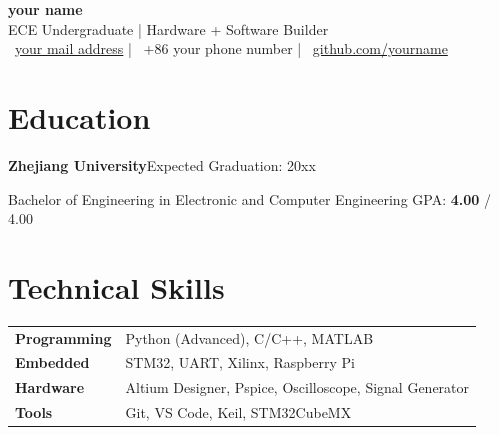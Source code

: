 \documentclass[10pt,a4paper]{article}
\newcommand{\entry}[2]{%
  \noindent\textbf{#1}\hfill{#2}\par
}
\begin{document}
\begin{center}
  {\headingfont\Huge\bfseries your name}\\[4pt]
  {\normalsize ECE Undergraduate | Hardware + Software Builder}\\[6pt]
  {\small
    \faEnvelope\ \href{mailto:your mail address}{your mail address}
    \quad|\quad
    \faPhone\ +86 your phone number
    \quad|\quad
    \faGithub\ \href{https://github.com/yourname}{github.com/yourname}
  }
\end{center}

\section{Education}

\entry{Zhejiang University}{Expected Graduation: 20xx}
Bachelor of Engineering in Electronic and Computer Engineering \hfill GPA: \textbf{4.00} / 4.00\par %
\vspace{2pt}

\section{Technical Skills}


\begin{tabular}{@{}p{3.2cm}@{}p{14cm}@{}}
  \textbf{Programming}      & Python (Advanced), C/C++, MATLAB \\[3pt]
  \textbf{Embedded}         & STM32, UART, Xilinx, Raspberry Pi \\[3pt]
  \textbf{Hardware}         & Altium Designer, Pspice, Oscilloscope, Signal Generator\\[3pt]
  \textbf{Tools}            & Git, VS Code, Keil, STM32CubeMX \\
\end{tabular}
\end{document}
